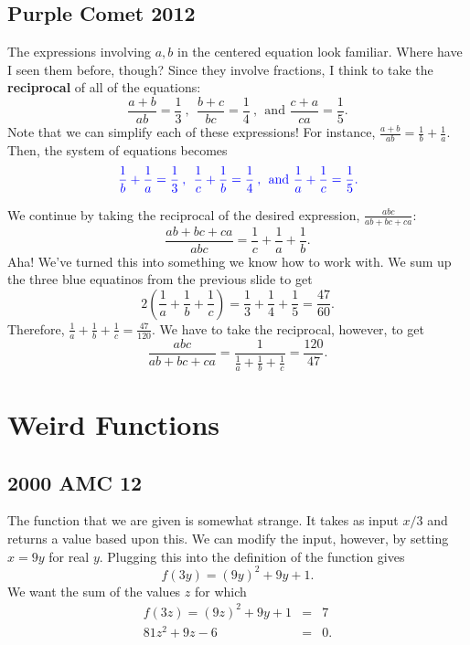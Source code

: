 \subsection{Purple Comet 2012}
The expressions involving $a,b$ in the centered equation look familiar. Where have I seen them before, though? Since they involve fractions, I think to take the \textbf{reciprocal} of all of the equations: $$\frac{a+b}{ab}=\frac13\:,\:\: \frac{b+c}{bc}=\frac14\:,\:\: \text{and } \frac{c+a}{ca}=\frac15.$$ 
Note that we can simplify each of these expressions! For instance, $\frac{a+b}{ab}=\frac{1}{b}+\frac{1}{a}$. Then, the system of equations becomes $$\color{blue}\frac{1}{b}+\frac{1}{a}=\frac13\:,\:\: \frac{1}{c}+\frac{1}{b}=\frac14\:,\:\: \text{and } \frac{1}{a}+\frac{1}{c}=\frac15.$$ 
\clearpage

We continue by taking the reciprocal of the desired expression, $\frac{abc}{ab+bc+ca}$: $$\frac{ab+bc+ca}{abc}=\frac{1}{c}+\frac{1}{a}+\frac{1}{b}.$$ Aha! We've turned this into something we know how to work with. We sum up the three blue equatinos from the previous slide to get $$2\left(\frac1a+\frac1b+\frac1c\right)=\frac13+\frac14+\frac15=\frac{47}{60}.$$ Therefore, $\displaystyle \frac1a+\frac1b+\frac1c=\frac{47}{120}$. We have to take the reciprocal, however, to get $$\frac{abc}{ab+bc+ca}=\frac{1}{\frac1a+\frac1b+\frac1c}=\boxed{\frac{120}{47}}.$$




\section{Weird Functions}


\subsection{2000 AMC 12}
The function that we are given is somewhat strange. It takes as input $x/3$ and returns a value based upon this. We can modify the input, however, by setting \color{blue} $x=9y$ \color{black} for real $y$. Plugging this into the definition of the function gives $$f(3y)=(9y)^2+9y+1.$$ We want the sum of the values $z$ for which \begin{eqnarray*} f(3z)=(9z)^2+9y+1&=&7 \\ 81z^2+9z-6 &=& 0. \end{eqnarray*}

